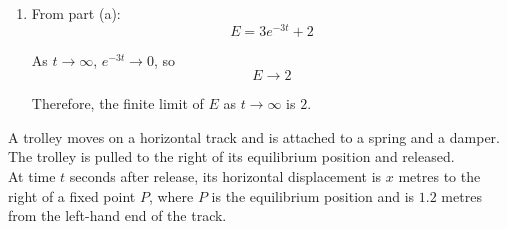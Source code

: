 \documentclass[leqno]{article}
\begin{document}
\begin{enumerate}[
  label=\textbf{\arabic*.},
  leftmargin=*,
  topsep=0pt,
  partopsep=0pt,
  parsep=0pt
]
\begin{djsSolution}
\begin{enumerate}[label=\textbf{(\alph*)}]
  Therefore the general solution is
  \[
  E=Ae^{-3t}+Be^{2t}+2
  \]

  It is given that $E$ tends to a finite limit as $t\to\infty$. Since $e^{2t}\to\infty$ as $t\to\infty$, the term $Be^{2t}$ must be absent. Hence
  \[
  B=0
  \]

  So
  \[
  E=Ae^{-3t}+2
  \]

  Differentiate:
  \[
  \frac{\mathrm{d}E}{\mathrm{d}t}=-3Ae^{-3t}
  \]

  Using the initial condition $\frac{\mathrm{d}E}{\mathrm{d}t}=-9$ when $t=0$:
  \[
  -3Ae^{0}=-9
  \]
  \[
  -3A=-9
  \]
  \[
  A=3
  \]

  Hence
  \[
  E=3e^{-3t}+2
  \]

  Now put $t=\ln 2$:
  \begin{align*}
  E(\ln 2)&=3e^{-3\ln 2}+2 \\
  &=3\left(e^{\ln 2}\right)^{-3}+2 \\
  &=3\times 2^{-3}+2 \\
  &=\frac{3}{8}+2 \\
  &=\frac{19}{8}
  \end{align*}

  Therefore, $E=\frac{19}{8}$ when $t=\ln 2$.

  \item From part (a):
  \[
  E=3e^{-3t}+2
  \]

  As $t\to\infty$, $e^{-3t}\to 0$, so
  \[
  E\to 2
  \]

  Therefore, the finite limit of $E$ as $t\to\infty$ is $2$.
\end{enumerate}
\end{djsSolution}


\newpage

\questionitem

A trolley moves on a horizontal track and is attached to a spring and a damper. The trolley is pulled to the right of its equilibrium position and released. \\

At time $t$ seconds after release, its horizontal displacement is $x$ metres to the right of a fixed point $P$, where $P$ is the equilibrium position and is $1.2$ metres from the left-hand end of the track. \\


\end{enumerate}
\end{document}
